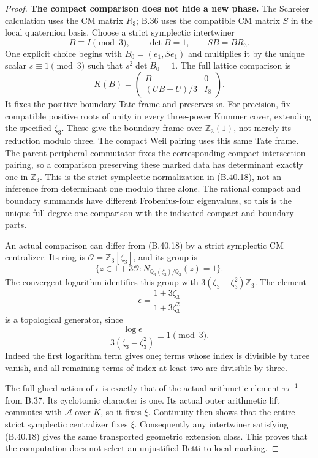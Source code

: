 \begin{proof}
\par\smallskip\noindent\textbf{The compact comparison does not hide a new phase.}\enspace 
The Schreier calculation uses the CM matrix $R_3$;
B.36 uses the compatible CM matrix $S$ in the local
quaternion basis.
Choose a strict symplectic intertwiner
\[
 B\equiv I\pmod3,\qquad \det B=1,\qquad SB=BR_3.
                                                               \tag{B.40.18}
\]
One explicit choice begins with $B_0=(e_1,Se_1)$ and
multiplies it by the unique scalar $s\equiv1\pmod3$
such that $s^2\det B_0=1$.
The full lattice comparison is
\[
 K(B)=\begin{pmatrix}
 B&0\\ (UB-U)/3&I_8
 \end{pmatrix}.                                                \tag{B.40.19}
\]
It fixes the positive boundary Tate frame and preserves
$w$. For precision, fix compatible positive roots of
unity in every three-power Kummer cover, extending the
specified $\zeta_3$. These give the boundary frame over
$\mathbb Z_3(1)$, not merely its reduction modulo three.
The compact Weil pairing uses this same Tate frame.
The parent peripheral commutator fixes the corresponding
compact intersection pairing, so a comparison preserving
these marked data has determinant exactly one in
$\mathbb Z_3$. This is the strict symplectic normalization
in (B.40.18), not an inference from determinant one
modulo three alone.
The rational compact and boundary summands have different
Frobenius-four eigenvalues, so this is the unique full
degree-one comparison with the indicated compact and
boundary parts.

An actual comparison can differ from (B.40.18) by a
strict symplectic CM centralizer. Its ring is
$\mathcal O=\mathbb Z_3[\zeta_3]$, and its group is
\[
 \{z\in1+3\mathcal O:N_{\mathbb Q_3(\zeta_3)/\mathbb Q_3}(z)=1\}.
\]
The convergent logarithm identifies this group with
$3(\zeta_3-\zeta_3^2)\mathbb Z_3$.
The element
\[
          \epsilon=\frac{1+3\zeta_3}{1+3\zeta_3^2}           \tag{B.40.20}
\]
is a topological generator, since
\[
 \frac{\log\epsilon}{3(\zeta_3-\zeta_3^2)}\equiv1\pmod3.
\]
Indeed the first logarithm term gives one; terms whose
index is divisible by three vanish, and all remaining
terms of index at least two are divisible by three.

The full glued action of $\epsilon$ is exactly that
of the actual arithmetic element $\tau\overline\tau^{-1}$
from B.37. Its cyclotomic character is one. Its actual
outer arithmetic lift commutes with $\mathcal A$ over
$K$, so it fixes $\xi$.
Continuity then shows that the entire strict symplectic
centralizer fixes $\xi$.
Consequently any intertwiner satisfying (B.40.18)
gives the same transported geometric extension class.
This proves that the computation does not select an
unjustified Betti-to-local marking.


\end{proof}
